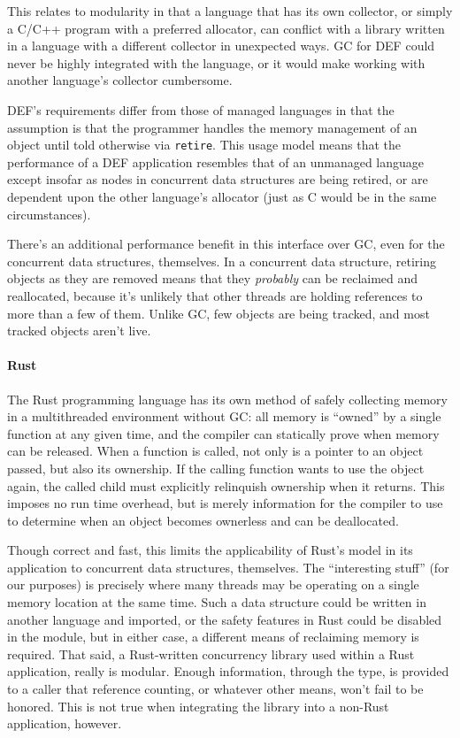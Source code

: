 This relates to modularity in that a language that has its own collector, or simply a C/C++ program with a preferred allocator, can conflict with a library written in a language with a different collector in unexpected ways.  GC for DEF could never be highly integrated with the language, or it would make working with another language's collector cumbersome.

DEF's requirements differ from those of managed languages in that the assumption is that the programmer handles the memory management of an object until told otherwise via \texttt{retire}.  This usage model means that the performance of a DEF application resembles that of an unmanaged language except insofar as nodes in concurrent data structures are being retired, or are dependent upon the other language's allocator (just as C would be in the same circumstances).

There's an additional performance benefit in this interface over GC, even for the concurrent data structures, themselves.  In a concurrent data structure, retiring objects as they are removed means that they \textit{probably} can be reclaimed and reallocated, because it's unlikely that other threads are holding references to more than a few of them.  Unlike GC, few objects are being tracked, and most tracked objects aren't live.

\paragraph{Rust} The Rust programming language has its own method of safely collecting memory in a multithreaded environment without GC: all memory is ``owned'' by a single function at any given time, and the compiler can statically prove when memory can be released.\cite{Rust}  When a function is called, not only is a pointer to an object passed, but also its ownership.  If the calling function wants to use the object again, the called child must explicitly relinquish ownership when it returns.  This imposes no run time overhead, but is merely information for the compiler to use to determine when an object becomes ownerless and can be deallocated.

Though correct and fast, this limits the applicability of Rust's model in its application to concurrent data structures, themselves.  The ``interesting stuff'' (for our purposes) is precisely where many threads may be operating on a single memory location at the same time.  Such a data structure could be written in another language and imported, or the safety features in Rust could be disabled in the module, but in either case, a different means of reclaiming memory is required.  That said, a Rust-written concurrency library used within a Rust application, really is modular.  Enough information, through the type, is provided to a caller that reference counting, or whatever other means, won't fail to be honored.  This is not true when integrating the library into a non-Rust application, however.

